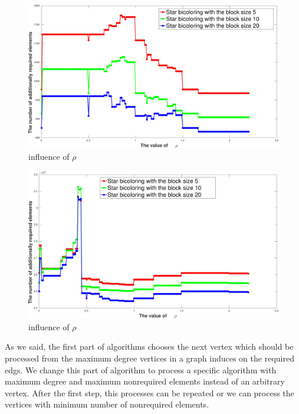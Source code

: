 \documentclass[12pt, oneside]{book}
\begin{document}
\begin{figure}
\includegraphics[width=0.9\linewidth]{rho_value_685_bus}
\caption{influence of $\rho$}
\label{rho_value_685_bus}
\end{figure}

\begin{figure}
\includegraphics[width=0.9\linewidth]{rho_value_orani678}
\caption{influence of $\rho$}
\label{rho_value_orani678}
\end{figure}

As we said, the first part of algorithms chooses the next vertex
which should be processed from the maximum degree vertices
in a graph induces on the required edgs.
We change this part of algorithm to process a specific algorithm
with maximum degree and maximum nonrequired elements instead of 
an arbitrary vertex. After the first step, this processes can be
repeated or we can process the vertices with 
minimum number of nonrequired elements.
\end{document}
